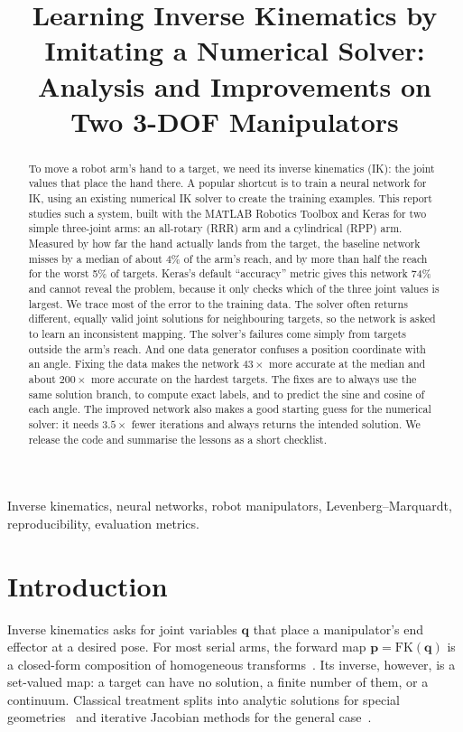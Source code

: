 \documentclass[conference]{IEEEtran}
\title{Learning Inverse Kinematics by Imitating a Numerical Solver: Analysis and Improvements on Two 3-DOF Manipulators}
\author{\IEEEauthorblockN{Durgesh S. Reddiyar}
\IEEEauthorblockA{Ira A. Fulton Schools of Engineering\\
Arizona State University, Tempe, AZ, USA\\
dreddiya@asu.edu}}
\newcommand{\p}{\mathbf{p}}
\newcommand{\q}{\mathbf{q}}
\newcommand{\FK}{\mathrm{FK}}
\begin{document}
\maketitle

\begin{abstract}
To move a robot arm's hand to a target, we need its inverse kinematics (IK): the joint values that place the hand there. A popular shortcut is to train a neural network for IK, using an existing numerical IK solver to create the training examples. This report studies such a system, built with the MATLAB Robotics Toolbox and Keras for two simple three-joint arms: an all-rotary (RRR) arm and a cylindrical (RPP) arm. Measured by how far the hand actually lands from the target, the baseline network misses by a median of about 4\% of the arm's reach, and by more than half the reach for the worst 5\% of targets. Keras's default ``accuracy'' metric gives this network 74\% and cannot reveal the problem, because it only checks which of the three joint values is largest. We trace most of the error to the training data. The solver often returns different, equally valid joint solutions for neighbouring targets, so the network is asked to learn an inconsistent mapping. The solver's failures come simply from targets outside the arm's reach. And one data generator confuses a position coordinate with an angle. Fixing the data makes the network $43\times$ more accurate at the median and about $200\times$ more accurate on the hardest targets. The fixes are to always use the same solution branch, to compute exact labels, and to predict the sine and cosine of each angle. The improved network also makes a good starting guess for the numerical solver: it needs $3.5\times$ fewer iterations and always returns the intended solution. We release the code and summarise the lessons as a short checklist.
\end{abstract}

\begin{IEEEkeywords}
Inverse kinematics, neural networks, robot manipulators, Levenberg--Marquardt, reproducibility, evaluation metrics.
\end{IEEEkeywords}

\section{Introduction}
\label{sec:intro}

Inverse kinematics asks for joint variables $\q$ that place a manipulator's end effector at a desired pose. For most serial arms, the forward map $\p=\FK(\q)$ is a closed-form composition of homogeneous transforms~\cite{denavit1955kinematic,siciliano2009robotics}. Its inverse, however, is a set-valued map: a target can have no solution, a finite number of them, or a continuum. Classical treatment splits into analytic solutions for special geometries~\cite{pieper1968kinematics,raghavan1993inverse,diankov2010automated} and iterative Jacobian methods for the general case~\cite{wampler1986manipulator,nakamura1986inverse,buss2004introduction,sugihara2011solvability,beeson2015trac}.
\end{document}
